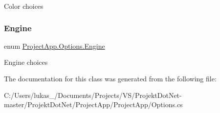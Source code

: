 Color choices 

\mbox{\label{class_project_app_1_1_options_a95e313182e8122da719f7c8caefcc88d}} 
\subsubsection{\texorpdfstring{Engine}{Engine}}
{\footnotesize\ttfamily enum \mbox{\hyperlink{class_project_app_1_1_options_a95e313182e8122da719f7c8caefcc88d}{Project\+App.\+Options.\+Engine}}\hspace{0.3cm}{\ttfamily [strong]}}



Engine choices 



The documentation for this class was generated from the following file\+:\begin{DoxyCompactItemize}
\item 
C\+:/\+Users/lukas\+\_/\+Documents/\+Projects/\+V\+S/\+Projekt\+Dot\+Net-\/master/\+Projekt\+Dot\+Net/\+Project\+App/\+Project\+App/Options.\+cs\end{DoxyCompactItemize}

